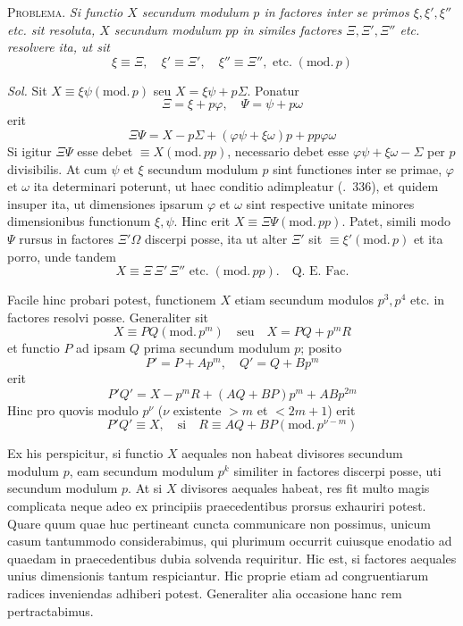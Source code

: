 \textsc{Problema.} \emph{Si functio $X$ secundum modulum $p$ in factores inter se primos $\xi,\xi',\xi''$ etc. sit resoluta, $X$ secundum modulum $pp$ in similes factores $\Xi,\Xi',\Xi''$ etc. resolvere ita, ut sit}
\[
\xi\equiv\Xi,\quad\xi'\equiv\Xi',\quad\xi''\equiv\Xi'',\text{ etc.}\;(\mathrm{mod.}\,p)
\]

\emph{Sol.} Sit $X\equiv\xi\psi(\mathrm{mod.}\,p)$ seu $X=\xi\psi+p\Sigma$. Ponatur
\[
\Xi=\xi+p\varphi,\quad\Psi=\psi+p\omega
\]
erit
\[
\Xi\Psi=X-p\Sigma+(\varphi\psi+\xi\omega)p+pp\varphi\omega
\]
Si igitur $\Xi\Psi$ esse debet $\equiv X(\mathrm{mod.}\,pp)$, necessario debet esse $\varphi\psi+\xi\omega-\Sigma$ per $p$ divisibilis. At cum $\psi$ et $\xi$ secundum modulum $p$ sint functiones inter se primae, $\varphi$ et $\omega$ ita determinari poterunt, ut haec conditio adimpleatur (\textsection.\ 336), et quidem insuper ita, ut dimensiones ipsarum $\varphi$ et $\omega$ sint respective unitate minores dimensionibus functionum $\xi,\psi$. Hinc erit $X\equiv\Xi\Psi(\mathrm{mod.}\,pp)$. Patet, simili modo $\Psi$ rursus in factores $\Xi'\Omega$ discerpi posse, ita ut alter $\Xi'$ sit $\equiv\xi'(\mathrm{mod.}\,p)$ et ita porro, unde tandem
\[
X\equiv\Xi\,\Xi'\,\Xi''\text{ etc.}\;(\mathrm{mod.}\,pp).\quad\text{Q. E. Fac.}
\]

Facile hinc probari potest, functionem $X$ etiam secundum modulos $p^3,p^4$ etc. in factores resolvi posse. Generaliter sit
\[
X\equiv PQ(\mathrm{mod.}\,p^m)\quad\text{seu}\quad X=PQ+p^mR
\]
et functio $P$ ad ipsam $Q$ prima secundum modulum $p$; posito
\[
P'=P+Ap^m,\quad Q'=Q+Bp^m
\]
erit
\[
P'Q'=X-p^mR+(AQ+BP)p^m+ABp^{2m}
\]
Hinc pro quovis modulo $p^\nu$ ($\nu$ existente $>m$ et $<2m+1$) erit
\[
P'Q'\equiv X,\quad\text{si}\quad R\equiv AQ+BP(\mathrm{mod.}\,p^{\nu-m})
\]

Ex his perspicitur, si functio $X$ aequales non habeat divisores secundum modulum $p$, eam secundum modulum $p^k$ similiter in factores discerpi posse, uti secundum modulum $p$. At si $X$ divisores aequales habeat, res fit multo magis complicata neque adeo ex principiis praecedentibus prorsus exhauriri potest. Quare quum quae huc pertineant cuncta communicare non possimus, unicum casum tantummodo considerabimus, qui plurimum occurrit cuiusque enodatio ad quaedam in praecedentibus dubia solvenda requiritur. Hic est, si factores aequales unius dimensionis tantum respiciantur. Hic proprie etiam ad congruentiarum radices inveniendas adhiberi potest. Generaliter alia occasione hanc rem pertractabimus.

